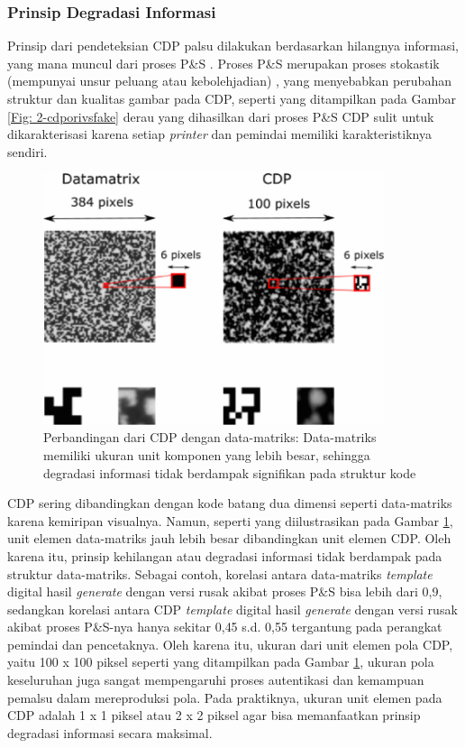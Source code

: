 \subsubsection{Prinsip Degradasi Informasi}
Prinsip dari pendeteksian CDP palsu dilakukan berdasarkan hilangnya informasi, yang mana muncul dari proses P\&S \cite{picard2004digital}. Proses P\&S
merupakan proses stokastik (mempunyai unsur peluang atau kebolehjadian) \cite{phan2014document}, yang menyebabkan perubahan struktur dan kualitas gambar pada
CDP, seperti yang ditampilkan pada Gambar \ref{Fig: 2-cdporivsfake} derau yang dihasilkan dari proses P\&S CDP sulit untuk dikarakterisasi
\cite{picard2008security} karena setiap \emph{printer} dan pemindai memiliki karakteristiknya sendiri.

\begin{figure}[!ht]
	\centering
	\includegraphics[width=10cm]{contents/chapter-2/2-datamatrixvscdp.png}
	\caption[Perbandingan dari CDP dengan data-matriks: Data-matriks memiliki ukuran unit komponen yang lebih besar, sehingga degradasi informasi tidak berdampak signifikan pada struktur kode]{Perbandingan dari CDP dengan data-matriks: Data-matriks memiliki ukuran unit komponen yang lebih besar, sehingga degradasi informasi tidak berdampak signifikan pada struktur kode \cite{PICARDCANCOPYDETECTIONPATTERN}}
	\label{Fig: 2-datamatrixvscdp}
\end{figure}

CDP sering dibandingkan dengan kode batang dua dimensi seperti data-matriks karena kemiripan visualnya. Namun, seperti yang diilustrasikan pada Gambar
\ref{Fig: 2-datamatrixvscdp}, unit elemen data-matriks jauh lebih besar dibandingkan unit elemen CDP. Oleh karena itu, prinsip kehilangan atau degradasi
informasi tidak berdampak pada struktur data-matriks. Sebagai contoh, korelasi antara data-matriks \emph{template} digital hasil \emph{generate} dengan versi
rusak akibat proses P\&S bisa lebih dari 0,9, sedangkan korelasi antara CDP \emph{template} digital hasil \emph{generate} dengan versi rusak akibat proses
P\&S-nya hanya sekitar 0,45 s.d. 0,55 tergantung pada perangkat pemindai dan pencetaknya. Oleh karena itu, ukuran dari unit elemen pola CDP, yaitu 100 x 100
piksel seperti yang ditampilkan pada Gambar \ref{Fig: 2-datamatrixvscdp}, ukuran pola keseluruhan juga sangat mempengaruhi proses autentikasi dan kemampuan
pemalsu dalam mereproduksi pola. Pada praktiknya, ukuran unit elemen pada CDP adalah 1 x 1 piksel atau 2 x 2 piksel agar bisa memanfaatkan prinsip degradasi
informasi secara maksimal.

